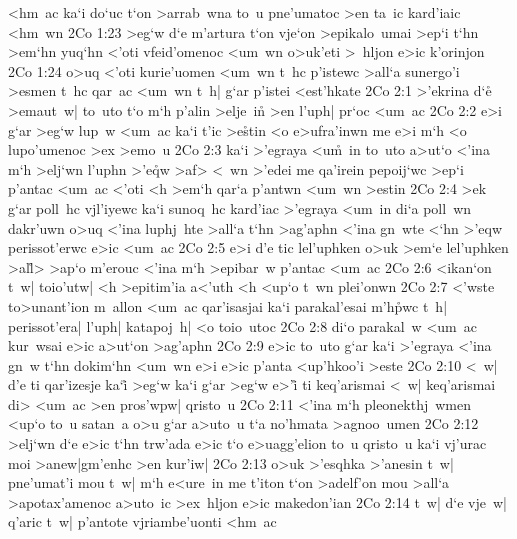 <hm~ac
ka`i
do`uc
t`on
>arrab~wna
to~u
pne'umatoc
>en
ta~ic
kard'iaic
<hm~wn\bibvsend
\vs 2Co 1:23
>eg`w
d`e
m'artura
t`on
vje`on
>epikalo~umai
>ep`i
t`hn
>em`hn
yuq`hn
<'oti
vfeid'omenoc
<um~wn
o>uk'eti
>~hljon
e>ic
k'orinjon\bibvsend
\vs 2Co 1:24
o>uq
<'oti
kurie'uomen
<um~wn
t~hc
p'istewc
>all`a
sunergo'i
>esmen
t~hc
qar~ac
<um~wn
t~h|
g`ar
p'istei
<est'hkate\bibvsend
\vs 2Co 2:1
>'ekrina
d`e\r{}
>emaut~w|
to~uto
t`o
m`h
p'alin
>elje~in\r{}
>en
l'uph|
pr`oc
<um~ac\bibvsend
\vs 2Co 2:2
e>i
g`ar
>eg`w
lup~w
<um~ac
ka`i
t'ic
>e\r{s}tin
<o
e>ufra'inwn
me
e>i
m`h
<o
lupo'umenoc
>ex
>emo~u\bibvsend
\vs 2Co 2:3
ka`i
>'egraya
<u\r{m}~in
to~uto
a>ut`o
<'ina
m`h
>elj`wn
l'uphn
>'e\r{q}w
>af>
<~wn
>'edei
me
qa'irein
pepoij`wc
>ep`i
p'antac
<um~ac
<'oti
<h
>em`h
qar`a
p'antwn
<um~wn
>estin\bibvsend
\vs 2Co 2:4
>ek
g`ar
poll~hc
vjl'iyewc
ka`i
sunoq~hc
kard'iac
>'egraya
<um~in
di`a
poll~wn
dakr'uwn
o>uq
<'ina
luphj~hte
>all`a
t`hn
>ag'aphn
<'ina
gn~wte
<`hn
>'eqw
perissot'erwc
e>ic
<um~ac\bibvsend
\vs 2Co 2:5
e>i
d'e
tic
lel'uphken
o>uk
>em`e
lel'uphken
>al\r{l}>
>ap`o
m'erouc
<'ina
m`h
>epibar~w
p'antac
<um~ac\bibvsend
\vs 2Co 2:6
<ikan`on
t~w|
toio'utw|
<h
>epitim'ia
a<'uth
<h
<up`o
t~wn
plei'onwn\bibvsend
\vs 2Co 2:7
<'wste
to>unant'ion
m~allon
<um~ac
qar'isasjai
ka`i
parakal'esai
m'h\r{p}wc
t~h|
perissot'era|
l'uph|
katapoj~h|
<o
toio~utoc\bibvsend
\vs 2Co 2:8
di`o
parakal~w
<um~ac
kur~wsai
e>ic
a>ut`on
>ag'aphn\bibvsend
\vs 2Co 2:9
e>ic
to~uto
g`ar
ka`i
>'egraya
<'ina
gn~w
t`hn
dokim`hn
<um~wn
e>i
e>ic
p'anta
<up'hkoo'i
>este\bibvsend
\vs 2Co 2:10
<~w|
d'e
ti
qar'izesje
ka`i\r{}
>eg`w
ka`i
g`ar
>eg`w
e>'i\r{}
ti
keq'arismai
<~w|
keq'arismai
di>
<um~ac
>en
pros'wpw|
qristo~u\bibvsend
\vs 2Co 2:11
<'ina
m`h
pleonekthj~wmen
<up`o
to~u
satan~a
o>u
g`ar
a>uto~u
t`a
no'hmata
>agnoo~umen\bibvsend
\vs 2Co 2:12
>elj`wn
d`e
e>ic
t`hn
trw'ada
e>ic
t`o
e>uagg'elion
to~u
qristo~u
ka`i
vj'urac
moi
>anew|gm'enhc
>en
kur'iw|\bibvsend
\vs 2Co 2:13
o>uk
>'esqhka
>'anesin
t~w|
pne'umat'i
mou
t~w|
m`h
e<ure~in
me
t'iton
t`on
>adelf'on
mou
>all`a
>apotax'amenoc
a>uto~ic
>ex~hljon
e>ic
makedon'ian\bibvsend
\vs 2Co 2:14
t~w|
d`e
vje~w|
q'aric
t~w|
p'antote
vjriambe'uonti
<hm~ac
